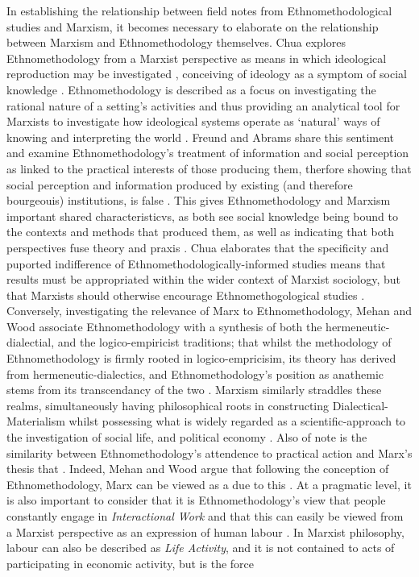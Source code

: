 In establishing the relationship between field notes from Ethnomethodological studies and Marxism, it becomes necessary to elaborate on the relationship between Marxism and Ethnomethodology themselves. Chua explores Ethnomethodology from a Marxist perspective as means in which ideological reproduction may be investigated , conceiving of ideology as a symptom of social knowledge \cite{chua_delineating_1977}. Ethnomethodology is described as a focus on investigating the rational nature of a setting's activities and thus providing an analytical tool for Marxists to investigate how ideological systems operate as `natural' ways of knowing and interpreting the world \cite{chua_delineating_1977}. Freund and Abrams share this sentiment and examine Ethnomethodology's treatment of information and social perception as linked to the practical interests of those producing them, therfore showing that social perception and information produced by existing (and therefore bourgeouis) institutions, is false \cite{freund_ethnomethodology_1976}. This gives Ethnomethodology and Marxism important shared characteristicvs, as both see social knowledge being bound to the contexts and methods that produced them, as well as indicating that both perspectives fuse theory and praxis \cite{freund_ethnomethodology_1976}. Chua elaborates that the specificity and puported indifference of Ethnomethodologically-informed studies means that results must be appropriated within the wider context of Marxist sociology, but that Marxists should otherwise encourage Ethnomethogological studies \cite{chua_delineating_1977}. Conversely, investigating the relevance of Marx to Ethnomethodology, Mehan and Wood associate Ethnomethodology with a synthesis of both the hermeneutic-dialectial, and the logico-empiricist traditions; that whilst the methodology of Ethnomethodology is firmly rooted in logico-empricisim, its theory has derived from hermeneutic-dialectics, and Ethnomethodology's position as anathemic stems from its transcendancy of the two \cite{mehan_morality_1975}. Marxism similarly straddles these realms, simultaneously having philosophical roots in constructing Dialectical-Materialism whilst possessing what is widely regarded as a scientific-approach to the investigation of social life, and political economy \cite{thomas_marxism_2008}. Also of note is the similarity between Ethnomethodology's attendence to practical action \cite{garfinkel_studies_1967, crabtree_doing_2012} and Marx's thesis that  \cite{marx_theses_1963}. Indeed, Mehan and Wood argue that following the conception of Ethnomethodology, Marx can be viewed as a  due to this \cite{mehan_morality_1975}. At a pragmatic level, it is also important to consider that it is Ethnomethodology's view that people constantly engage in \textit{Interactional Work} \cite{garfinkel_ethnomethodological_2005, crabtree_doing_2012} and that this can easily be viewed from a Marxist perspective as an expression of human labour \cite{marx_economic_1844}. In Marxist philosophy, labour can also be described as \textit{Life Activity}, and it is not contained to acts of participating in economic activity, but is the force 